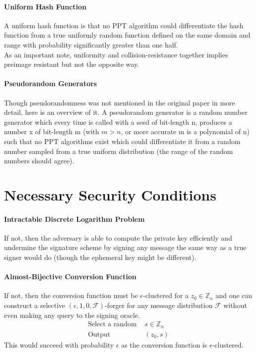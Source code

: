 \documentclass[18]{article}
\begin{document}
\paragraph{Uniform Hash Function}
A uniform hash function is that no PPT algorithm could differentiate the hash function from a true uniformly random function defined on the same domain and range with probability significantly greater than one half.\\

As an important note, uniformity and collision-resistance together implies preimage resistant but not the opposite way.
\paragraph{Pseudorandom Generators}
Though pseudorandomness was not mentioned in the original paper in more detail, here is an overview of it. A pseudorandom generator is a random number generator which every time is called with a seed of bit-length n, produces a number x of bit-length m (with $m > n$, or more accurate m is a polynomial of n) such that no PPT algorithms exist which could differentiate it from a random number sampled from a true uniform distribution (the range of the random numbers should agree).

\section{Necessary Security Conditions}
\paragraph{Intractable Discrete Logarithm Problem}
If not, then the adversary is able to compute the private key efficiently and undermine the signature scheme by signing any message the same way as a true signer would do (though the ephemeral key might be different).
\paragraph{Almost-Bijective Conversion Function}
If not, then the conversion function must be $\epsilon$-clustered for a $z_0\in \mathbb{Z}_n$ and one can construct a selective
$(\epsilon, 1, 0, \mathscr{F})$-forger for any message distribution $\mathscr{F}$ without even making any query to the signing oracle.
\begin{align*}
\text{Select a random } &s\in \mathbb{Z}_n\\
\text{Output } &(z_0,s)
\end{align*}
This would succeed with probability $\epsilon$ as the conversion function is $\epsilon$-clustered.
\end{document}
